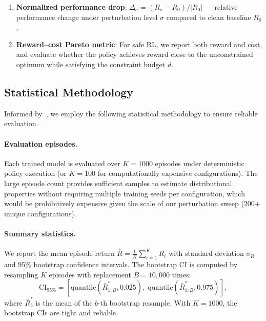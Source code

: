 \begin{definition}\label{def:derived_metrics}
\hfill
\begin{enumerate}
    \item \textbf{Normalized performance drop}: $\Delta_\sigma = (R_\sigma - R_0)/|R_0|$ --- relative performance change under perturbation level $\sigma$ compared to clean baseline $R_0$.
    \item \textbf{Reward--cost Pareto metric}: For safe RL, we report both reward and cost, and evaluate whether the policy achieves reward close to the unconstrained optimum while satisfying the constraint budget $d$.
\end{enumerate}
\end{definition}

\subsection{Statistical Methodology}
\label{sec:stat_methods}

Informed by~\citet{agarwal2021deep}, we employ the following statistical methodology to ensure reliable evaluation.

\paragraph{Evaluation episodes.} Each trained model is evaluated over $K = 1000$ episodes under deterministic policy execution (or $K = 100$ for computationally expensive configurations). The large episode count provides sufficient samples to estimate distributional properties without requiring multiple training seeds per configuration, which would be prohibitively expensive given the scale of our perturbation sweep (200+ unique configurations).

\paragraph{Summary statistics.} We report the mean episode return $\bar{R} = \frac{1}{K}\sum_{i=1}^K R_i$ with standard deviation $\sigma_R$ and 95\% bootstrap confidence intervals. The bootstrap CI is computed by resampling $K$ episodes with replacement $B = 10{,}000$ times:
\begin{equation}
    \text{CI}_{95\%} = \left[\text{quantile}(\bar{R}^*_{1:B}, 0.025),\; \text{quantile}(\bar{R}^*_{1:B}, 0.975)\right],
    \label{eq:bootstrap_ci}
\end{equation}
where $\bar{R}^*_b$ is the mean of the $b$-th bootstrap resample. With $K = 1000$, the bootstrap CIs are tight and reliable.

